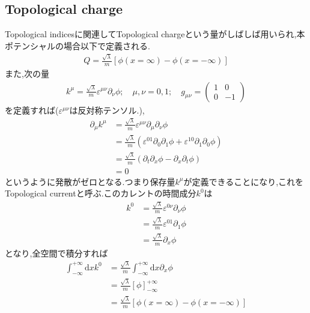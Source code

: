 \documentclass[dvipdfmx,11pt,a4paper,oneside,openany]{jsbook}
\begin{document}
\subsection{Topological charge}
Topological indicesに関連してTopological chargeという量がしばしば用いられ,本ポテンシャルの場合以下で定義される.
\begin{align}
    Q=\frac{\sqrt{\lambda}}{m}[\phi(x=\infty)-\phi(x=-\infty)]
\end{align}
また,次の量
\begin{align}
    k^{\mu}=\frac{\sqrt{\lambda}}{m} \varepsilon^{\mu \nu} \partial_{\nu} \phi;\quad \mu,\nu=0,1;\quad g_{\mu \nu}=
    \begin{pmatrix}
        1 & 0  \\
        0 & -1
    \end{pmatrix}
\end{align}
を定義すれば($\varepsilon^{\mu\nu}$は反対称テンソル.),
\begin{align*}
    \partial_{\mu} k^{\mu} & =\frac{\sqrt{\lambda}}{m} \varepsilon^{\mu \nu} \partial_{\mu} \partial_{\nu} \phi                                                    \\
                           & =\frac{\sqrt{\lambda}}{m}\left(\varepsilon^{01} \partial_{0} \partial_{1} \phi+\varepsilon^{10} \partial_{1} \partial_{0} \phi\right) \\
                           & =\frac{\sqrt{\lambda}}{m}\left(\partial_{t} \partial_{x} \phi-\partial_{x} \partial_{t} \phi\right)                                   \\
                           & =0
\end{align*}
というように発散がゼロとなる.つまり保存量$k^{\mu}$が定義できることになり,これをTopological currentと呼ぶ.このカレントの時間成分$k^{0}$は
\begin{align*}
    k^{0} & =\frac{\sqrt{\lambda}}{m} \varepsilon^{0 \nu} \partial_{\nu} \phi \\
          & =\frac{\sqrt{\lambda}}{m} \varepsilon^{01} \partial_{1} \phi      \\
          & =\frac{\sqrt{\lambda}}{m} \partial_{x} \phi
\end{align*}
となり,全空間で積分すれば
\begin{align*}
    \int_{-\infty}^{+\infty} \mathrm{d} x k^{0} & =\frac{\sqrt{\lambda}}{m} \int_{-\infty}^{+\infty} \mathrm{d} x \partial_{x} \phi \\
                                                & =\frac{\sqrt{\lambda}}{m}[\phi]_{-\infty}^{+\infty}                               \\
                                                & =\frac{\sqrt{\lambda}}{m}[\phi(x=\infty)-\phi(x=-\infty)]
\end{align*}
\end{document}
